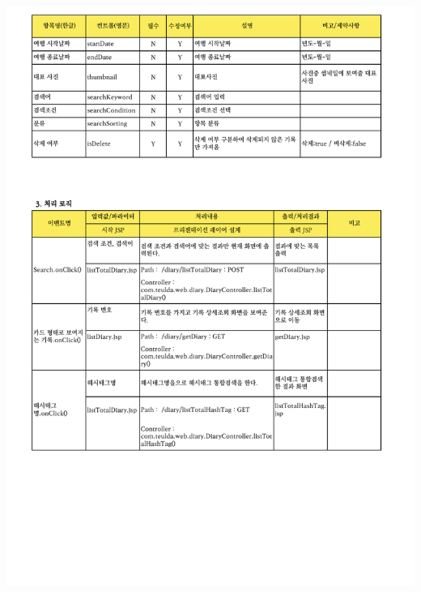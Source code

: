 {{{{{{{{{{{{{{{{{{{{{{{{{{{{{{{{{{{{{{{{{{{{{{{{{{{{{{{{{{{{{{{{{{{{{{{{{{{{{{{\includegraphics[width=20cm]{./Figure/Design/Display/totalSearch/totalSearch_02.pdf} \\
}}}}}}}}}}}}}}}}}}}}}}}}}}}}}}}}}}}}}}}}}}}}}}}}}}}}}}}}}}}}}}}}}}}}}}}}}}}}}}}
